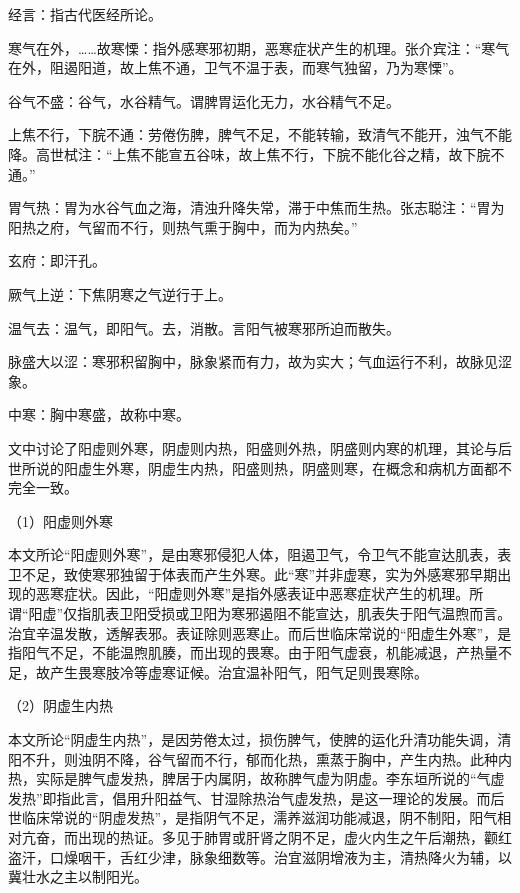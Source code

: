 \documentclass[draft,12pt]{ctexbook}
\begin{document}

\begin{jiaozhu}
  \item 经言：指古代医经所论。
  \item 寒气在外，……故寒慄：指外感寒邪初期，恶寒症状产生的机理。张介宾注：“寒气在外，阻遏阳道，故上焦不通，卫气不温于表，而寒气独留，乃为寒慄”。
  \item 谷气不盛：谷气，水谷精气。谓脾胃运化无力，水谷精气不足。
  \item 上焦不行，下脘不通：劳倦伤脾，脾气不足，不能转输，致清气不能开，浊气不能降。高世栻注：“上焦不能宣五谷味，故上焦不行，下脘不能化谷之精，故下脘不通。”
  \item 胃气热：胃为水谷气血之海，清浊升降失常，滞于中焦而生热。张志聪注：“胃为阳热之府，气留而不行，则热气熏于胸中，而为内热矣。”
  \item 玄府：即汗孔。
  \item 厥气上逆：下焦阴寒之气逆行于上。
  \item 温气去：温气，即阳气。去，消散。言阳气被寒邪所迫而散失。
  \item 脉盛大以涩：寒邪积留胸中，脉象紧而有力，故为实大；气血运行不利，故脉见涩象。
  \item 中寒：胸中寒盛，故称中寒。
\end{jiaozhu}



文中讨论了阳虚则外寒，阴虚则内热，阳盛则外热，阴盛则内寒的机理，其论与后世所说的阳虚生外寒，阴虚生内热，阳盛则热，阴盛则寒，在概念和病机方面都不完全一致。

（1）阳虚则外寒

本文所论“阳虚则外寒”，是由寒邪侵犯人体，阻遏卫气，令卫气不能宣达肌表，表卫不足，致使寒邪独留于体表而产生外寒。此“寒”并非虚寒，实为外感寒邪早期出现的恶寒症状。因此，“阳虚则外寒”是指外感表证中恶寒症状产生的机理。所谓“阳虚”仅指肌表卫阳受损或卫阳为寒邪遏阻不能宣达，肌表失于阳气温煦而言。治宜辛温发散，透解表邪。表证除则恶寒止。而后世临床常说的“阳虚生外寒”，是指阳气不足，不能温煦肌腠，而出现的畏寒。由于阳气虚衰，机能减退，产热量不足，故产生畏寒肢冷等虚寒证候。治宜温补阳气，阳气足则畏寒除。

（2）阴虚生内热

本文所论“阴虚生内热”，是因劳倦太过，损伤脾气，使脾的运化升清功能失调，清阳不升，则浊阴不降，谷气留而不行，郁而化热，熏蒸于胸中，产生内热。此种内热，实际是脾气虚发热，脾居于内属阴，故称脾气虚为阴虚。李东垣所说的“气虚发热”即指此言，倡用升阳益气、甘湿除热治气虚发热，是这一理论的发展。而后世临床常说的“阴虚发热”，是指阴气不足，濡养滋润功能减退，阴不制阳，阳气相对亢奋，而出现的热证。多见于肺胃或肝肾之阴不足，虚火内生之午后潮热，颧红盗汗，口燥咽干，舌红少津，脉象细数等。治宜滋阴增液为主，清热降火为辅，以冀壮水之主以制阳光。
\end{document}
